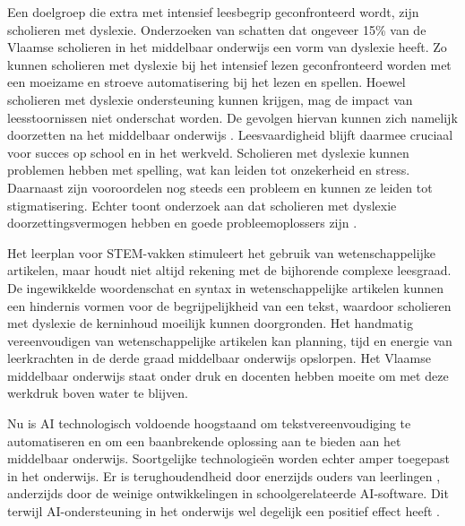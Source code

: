\medspace 

Een doelgroep die extra met intensief leesbegrip geconfronteerd wordt, zijn scholieren met dyslexie. Onderzoeken van \textcite{Bonte2020, VanDerMeer2022} schatten dat ongeveer 15\% van de Vlaamse scholieren in het middelbaar onderwijs een vorm van dyslexie heeft. Zo kunnen scholieren met dyslexie bij het intensief lezen geconfronteerd worden met een moeizame en stroeve automatisering bij het lezen en spellen. Hoewel scholieren met dyslexie ondersteuning kunnen krijgen, mag de impact van leesstoornissen niet onderschat worden. De gevolgen hiervan kunnen zich namelijk doorzetten na het middelbaar onderwijs \autocite{Lissens2020}. Leesvaardigheid blijft daarmee cruciaal voor succes op school en in het werkveld. Scholieren met dyslexie kunnen problemen hebben met spelling, wat kan leiden tot onzekerheid en stress. Daarnaast zijn vooroordelen nog steeds een probleem en kunnen ze leiden tot stigmatisering. Echter toont onderzoek aan dat scholieren met dyslexie doorzettingsvermogen hebben en goede probleemoplossers zijn \autocite{Ghesquiere2018, Lissens2020, Bonte2020}. 

\medspace

Het leerplan voor STEM-vakken stimuleert het gebruik van wetenschappelijke artikelen, maar houdt niet altijd rekening met de bijhorende complexe leesgraad. De ingewikkelde woordenschat en syntax in wetenschappelijke artikelen kunnen een hindernis vormen voor de begrijpelijkheid van een tekst, waardoor scholieren met dyslexie de kerninhoud moeilijk kunnen doorgronden. Het handmatig vereenvoudigen van wetenschappelijke artikelen kan planning, tijd en energie van leerkrachten in de derde graad middelbaar onderwijs opslorpen. Het Vlaamse middelbaar onderwijs staat onder druk en docenten hebben moeite om met deze werkdruk boven water te blijven. 

\medspace

Nu is AI technologisch voldoende hoogstaand om tekstvereenvoudiging te automatiseren en om een baanbrekende oplossing aan te bieden aan het middelbaar onderwijs. Soortgelijke technologieën worden echter amper toegepast in het onderwijs. Er is terughoudendheid door enerzijds ouders van leerlingen \autocite{Martens2021a}, anderzijds door de weinige ontwikkelingen in schoolgerelateerde AI-software. Dit terwijl AI-ondersteuning in het onderwijs wel degelijk een positief effect heeft \autocite{Belpaeme2018, Kraft2020}. 

\medspace


